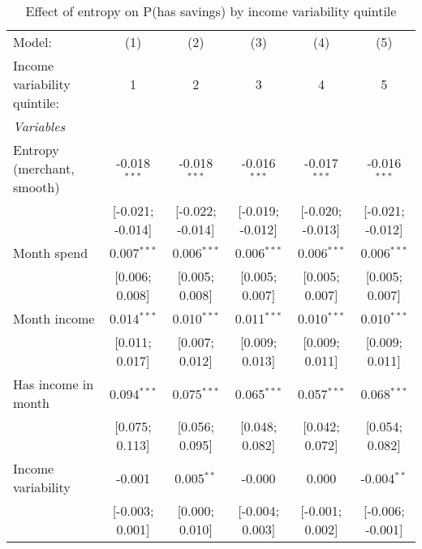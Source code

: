 
\begin{table}[htbp]
   \centering
   \tiny
   \begin{threeparttable}[b]
      \caption{\label{tab:reg_has_inflows_entropy_merchant_sz_inc_var_quint} Effect of entropy on P(has savings) by income variability quintile}
      \begin{tabular}{lccccc}
         \tabularnewline \midrule \midrule
         Model:                       & (1)              & (2)              & (3)              & (4)              & (5)\\  
         Income variability quintile: & 1                & 2                & 3                & 4                & 5 \\   
         \midrule
         \emph{Variables}\\
         Entropy (merchant, smooth)   & -0.018$^{***}$   & -0.018$^{***}$   & -0.016$^{***}$   & -0.017$^{***}$   & -0.016$^{***}$\\   
                                      & [-0.021; -0.014] & [-0.022; -0.014] & [-0.019; -0.012] & [-0.020; -0.013] & [-0.021; -0.012]\\   
         Month spend                  & 0.007$^{***}$    & 0.006$^{***}$    & 0.006$^{***}$    & 0.006$^{***}$    & 0.006$^{***}$\\   
                                      & [0.006; 0.008]   & [0.005; 0.008]   & [0.005; 0.007]   & [0.005; 0.007]   & [0.005; 0.007]\\   
         Month income                 & 0.014$^{***}$    & 0.010$^{***}$    & 0.011$^{***}$    & 0.010$^{***}$    & 0.010$^{***}$\\   
                                      & [0.011; 0.017]   & [0.007; 0.012]   & [0.009; 0.013]   & [0.009; 0.011]   & [0.009; 0.011]\\   
         Has income in month          & 0.094$^{***}$    & 0.075$^{***}$    & 0.065$^{***}$    & 0.057$^{***}$    & 0.068$^{***}$\\   
                                      & [0.075; 0.113]   & [0.056; 0.095]   & [0.048; 0.082]   & [0.042; 0.072]   & [0.054; 0.082]\\   
         Income variability           & -0.001           & 0.005$^{**}$     & -0.000           & 0.000            & -0.004$^{**}$\\   
                                      & [-0.003; 0.001]  & [0.000; 0.010]   & [-0.004; 0.003]  & [-0.001; 0.002]  & [-0.006; -0.001]\\   
         \midrule

\end{tabular}
\end{threeparttable}
\end{table}
